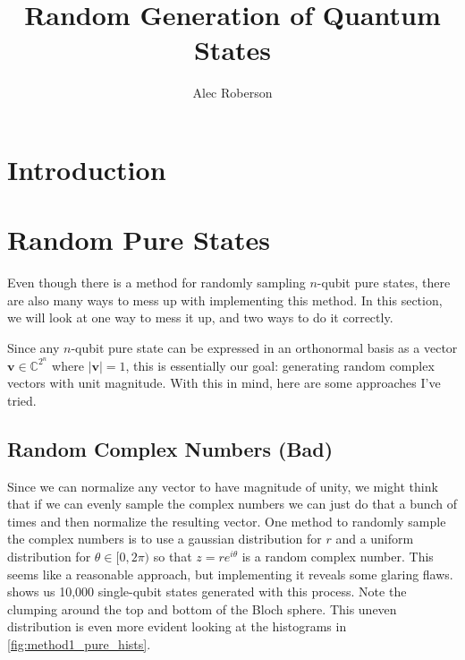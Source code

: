 \documentclass{paper}[11pt]
\title{Random Generation of Quantum States}
\author{Alec Roberson}
\newcommand{\bv}[1]{\textbf{#1}}
\begin{document}
	
	\maketitle
	
	\section{Introduction}
	
	

	\section{Random Pure States}
	
	Even though there is a method for randomly sampling $n$-qubit pure states, there are also many ways to mess up with implementing this method. In this section, we will look at one way to mess it up, and two ways to do it correctly.
	
	Since any $n$-qubit pure state can be expressed in an orthonormal basis as a vector $\bv{v}\in\mathbb{C}^{2^n}$ where $|\bv{v}|=1$, this is essentially our goal: generating random complex vectors with unit magnitude. With this in mind, here are some approaches I've tried.
	
	\subsection{Random Complex Numbers (Bad)}
	Since we can normalize any vector to have magnitude of unity, we might think that if we can evenly sample the complex numbers we can just do that a bunch of times and then normalize the resulting vector. One method to randomly sample the complex numbers is to use a gaussian distribution for $r$ and a uniform distribution for $\theta\in[0,2\pi)$ so that $z=re^{i\theta}$ is a random complex number. This seems like a reasonable approach, but implementing it reveals some glaring flaws.  shows us 10,000 single-qubit states generated with this process. Note the clumping around the top and bottom of the Bloch sphere. This uneven distribution is even more evident looking at the histograms in \cref{fig:method1_pure_hists}.
	
\end{document}
